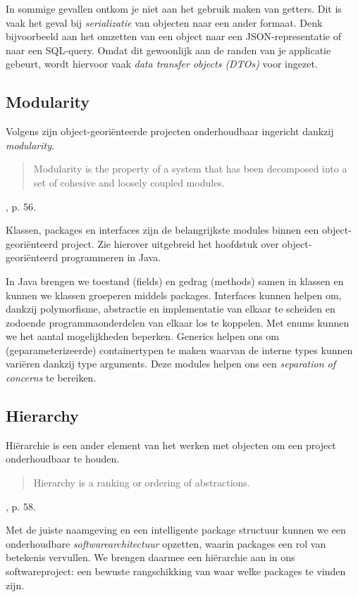 In sommige gevallen ontkom je niet aan het gebruik maken van getters.
Dit is vaak het geval bij \textit{serializatie} van objecten naar een ander formaat.
Denk bijvoorbeeld aan het omzetten van een object naar een JSON-representatie 
of naar een SQL-query. Omdat dit gewoonlijk aan de randen van je applicatie gebeurt,
wordt hiervoor vaak \textit{data transfer objects (DTOs)} voor ingezet.

\subsection{Modularity}
Volgens \cite{Booch2007} zijn object-georiënteerde projecten
onderhoudbaar ingericht dankzij \textit{modularity}.

\blockquote{
    Modularity is the property of a system
    that has been decomposed into a set
    of cohesive and loosely coupled modules.    
}{\cite{Booch2007}, p. 56.}

Klassen, packages en interfaces zijn de belangrijkste modules binnen 
een object-georiënteerd project. Zie hierover uitgebreid het hoofdstuk 
over object-georiënteerd programmeren in Java.

In Java brengen we toestand (fields) en gedrag (methods) samen 
in klassen en kunnen we klassen groeperen middels packages.
Interfaces kunnen helpen om, dankzij polymorfisme, abstractie en 
implementatie van elkaar te scheiden en zodoende programmaonderdelen 
van elkaar los te koppelen. Met enums kunnen we het aantal mogelijkheden 
beperken. Generics helpen ons om (geparameterizeerde) containertypen te 
maken waarvan de interne types kunnen variëren dankzij type arguments.
Deze modules helpen ons een \textit{separation of concerns} te bereiken.

\subsection{Hierarchy}
Hiërarchie is een ander element van het werken met objecten om een 
project onderhoudbaar te houden.

\blockquote{
    Hierarchy is a ranking or ordering of abstractions.
}{\cite{Booch2007}, p. 58.}

Met de juiste naamgeving en een intelligente package structuur 
kunnen we een onderhoudbare \textit{softwarearchitectuur} opzetten, waarin 
packages een rol van betekenis vervullen. We brengen daarmee een 
hiërarchie aan in ons softwareproject: een bewuste rangschikking van waar welke 
packages te vinden zijn.

